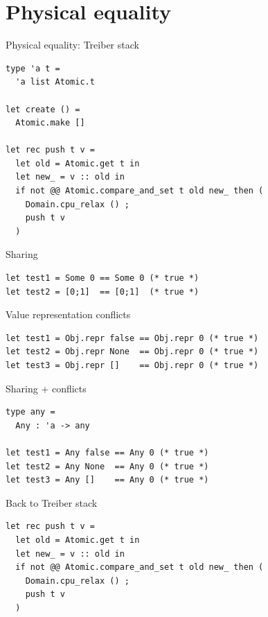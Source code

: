 \section{Physical equality}

\begin{frame}[fragile]{Physical equality: Treiber stack}
\large
\begin{verbatim}
type 'a t =
  'a list Atomic.t

let create () =
  Atomic.make []

let rec push t v =
  let old = Atomic.get t in
  let new_ = v :: old in
  if not @@ Atomic.compare_and_set t old new_ then (
    Domain.cpu_relax () ;
    push t v
  )
\end{verbatim}
\end{frame}

\begin{frame}[fragile]{Sharing}
\Large
\begin{verbatim}
let test1 = Some 0 == Some 0 (* true *)
let test2 = [0;1]  == [0;1]  (* true *)
\end{verbatim}
\end{frame}

\begin{frame}[fragile]{Value representation conflicts}
\Large
\begin{verbatim}
let test1 = Obj.repr false == Obj.repr 0 (* true *)
let test2 = Obj.repr None  == Obj.repr 0 (* true *)
let test3 = Obj.repr []    == Obj.repr 0 (* true *)
\end{verbatim}
\end{frame}

\begin{frame}[fragile]{Sharing + conflicts}
\Large
\begin{verbatim}
type any =
  Any : 'a -> any

let test1 = Any false == Any 0 (* true *)
let test2 = Any None  == Any 0 (* true *)
let test3 = Any []    == Any 0 (* true *)
\end{verbatim}
\end{frame}

\begin{frame}[fragile]{Back to Treiber stack}
\Large
\begin{verbatim}
let rec push t v =
  let old = Atomic.get t in
  let new_ = v :: old in
  if not @@ Atomic.compare_and_set t old new_ then (
    Domain.cpu_relax () ;
    push t v
  )
\end{verbatim}
\end{frame}

